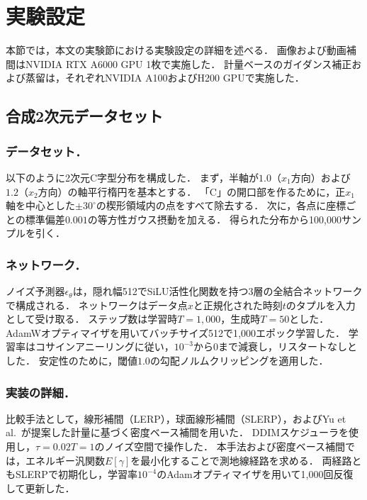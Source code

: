 \documentclass[MIRU,submit]{miru2026j}
\theoremstyle{definition}
\begin{document}
\section{実験設定}
\label{appendix:experimental}
本節では，本文の実験節における実験設定の詳細を述べる．
画像および動画補間はNVIDIA RTX A6000 GPU 1枚で実施した．
計量ベースのガイダンス補正および蒸留は，それぞれNVIDIA A100およびH200 GPUで実施した．

\subsection{合成2次元データセット}
\label{appendix:synthetic}

\subsubsection{データセット．}
以下のように2次元C字型分布を構成した．
まず，半軸が$1.0$（$x_1$方向）および$1.2$（$x_2$方向）の軸平行楕円を基本とする．
「C」の開口部を作るために，正$x_1$軸を中心とした$\pm 30^\circ$の楔形領域内の点をすべて除去する．
次に，各点に座標ごとの標準偏差$0.001$の等方性ガウス摂動を加える．
得られた分布から100{,}000サンプルを引く．

\subsubsection{ネットワーク．}
ノイズ予測器$\epsilon_\theta$は，隠れ幅512でSiLU活性化関数\cite{Elfwing2017}を持つ3層の全結合ネットワークで構成される．
ネットワークはデータ点$x$と正規化された時刻$t$のタプルを入力として受け取る．
ステップ数は学習時$T=1{,}000$，生成時$T=50$とした．
AdamWオプティマイザ\cite{Loshchilov2019}を用いてバッチサイズ512で1{,}000エポック学習した．
学習率はコサインアニーリング\cite{Loshchilov2017}に従い，$10^{-3}$から$0$まで減衰し，リスタートなしとした．
安定性のために，閾値$1.0$の勾配ノルムクリッピングを適用した．

\subsubsection{実装の詳細．}
比較手法として，線形補間（LERP）\cite{Ho2020}，球面線形補間（SLERP）\cite{Song2021a}，およびYu et al.~\cite{Yu2025}が提案した計量に基づく密度ベース補間を用いた．
DDIMスケジューラ\cite{Song2021a}を使用し，$\tau=0.02T=1$のノイズ空間で操作した．
本手法および密度ベース補間では，エネルギー汎関数$E[\gamma]$を最小化することで測地線経路を求める．
両経路ともSLERPで初期化し，学習率$10^{-4}$のAdamオプティマイザ\cite{Kingma2015}を用いて1{,}000回反復して更新した．
\end{document}

